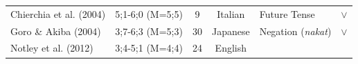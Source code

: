 \documentclass[oneside]{report}
\theoremstyle{definition}
\theoremstyle{definition}
\theoremstyle{definition}
\theoremstyle{remark}
\begin{document}
\begin{longtable}[]{@{}lccclc@{}}
\begin{minipage}[t]{0.23\columnwidth}
Chierchia et al. (2004)\strut
\end{minipage} & \begin{minipage}[t]{0.07\columnwidth}\centering\strut
5;1-6;0 (M=5;5)\strut
\end{minipage} & \begin{minipage}[t]{0.05\columnwidth}\centering\strut
9\strut
\end{minipage} & \begin{minipage}[t]{0.10\columnwidth}\centering\strut
Italian\strut
\end{minipage} & \begin{minipage}[t]{0.25\columnwidth}\raggedright\strut
Future Tense\strut
\end{minipage} & \begin{minipage}[t]{0.13\columnwidth}\centering\strut
\(\lor\)\strut
\end{minipage}\tabularnewline
\begin{minipage}[t]{0.23\columnwidth}\raggedright\strut
Goro \& Akiba (2004)\strut
\end{minipage} & \begin{minipage}[t]{0.07\columnwidth}\centering\strut
3;7-6;3 (M=5;3)\strut
\end{minipage} & \begin{minipage}[t]{0.05\columnwidth}\centering\strut
30\strut
\end{minipage} & \begin{minipage}[t]{0.10\columnwidth}\centering\strut
Japanese\strut
\end{minipage} & \begin{minipage}[t]{0.25\columnwidth}\raggedright\strut
Negation (\emph{nakat})\strut
\end{minipage} & \begin{minipage}[t]{0.13\columnwidth}\centering\strut
\(\lor\)\strut
\end{minipage}\tabularnewline
\begin{minipage}[t]{0.23\columnwidth}\raggedright\strut
Notley et al. (2012)\strut
\end{minipage} & \begin{minipage}[t]{0.07\columnwidth}\centering\strut
3;4-5;1 (M=4;4)\strut
\end{minipage} & \begin{minipage}[t]{0.05\columnwidth}\centering\strut
24\strut
\end{minipage} & \begin{minipage}[t]{0.10\columnwidth}\centering\strut
English\strut
\end{minipage} & \begin{minipage}[t]{0.25\columnwidth}\raggedright\strut

\end{minipage}
\end{longtable}
\end{document}
